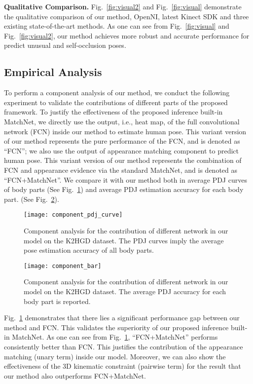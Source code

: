 \documentclass{sig-alternate-05-2015}
\begin{document}
\textbf{Qualitative Comparison.} Fig.~\ref{fig:visual2} and Fig.~\ref{fig:visual} demonstrate the qualitative comparison of our method, OpenNI, latest Kinect SDK and three existing state-of-the-art methods. As one can see from Fig.~\ref{fig:visual} and Fig.~\ref{fig:visual2}, our method achieves more robust and accurate performance for predict unusual and self-occlusion poses. 


\subsection{Empirical Analysis}
To perform a component analysis of our method, we conduct the following experiment to validate the contributions of different parts of the proposed framework. To justify the effectiveness of the proposed inference built-in MatchNet, we directly use the output, i.e., heat map, of the full convolutional network (FCN) inside our method to estimate human pose. This variant version of our method represents the pure performance of the FCN, and is denoted as ``FCN''; we also use the output of appearance matching component to predict human pose. This variant version of our method represents the combination of FCN and appearance evidence via the standard MatchNet, and is denoted as ``FCN+MatchNet''.
We compare it with our method both in average PDJ curves of body parts (See Fig.~\ref{fig:component_curve}) and average PDJ estimation accuracy for each body part. (See Fig.~\ref{fig:component_bar}). 

\begin{figure}[t]
\centering
\texttt{[image: component\_pdj\_curve]}
\caption{Component analysis for the contribution of different network in our model on the K2HGD dataset. The PDJ curves imply the average pose estimation accuracy of all body parts.}\label{fig:component_curve}
\end{figure}

\begin{figure}[t]
\centering
\texttt{[image: component\_bar]}
\caption{Component analysis for the contribution of different network in our model on the K2HGD dataset. The average PDJ accuracy for each body part is reported.}\label{fig:component_bar}
\end{figure}

Fig.~\ref{fig:component_curve} demonstrates that there lies a significant performance gap between our method and FCN. This validates the superiority of our proposed inference built-in MatchNet. As one can see from Fig.~\ref{fig:component_curve}, ``FCN+MatchNet'' performs consistently better than FCN. This justifies the contribution of the appearance matching (unary term) inside our model. Moreover, we can also show the effectiveness of the 3D kinematic constraint (pairwise term) for the result that our method also outperforms FCN+MatchNet.
\end{document}
